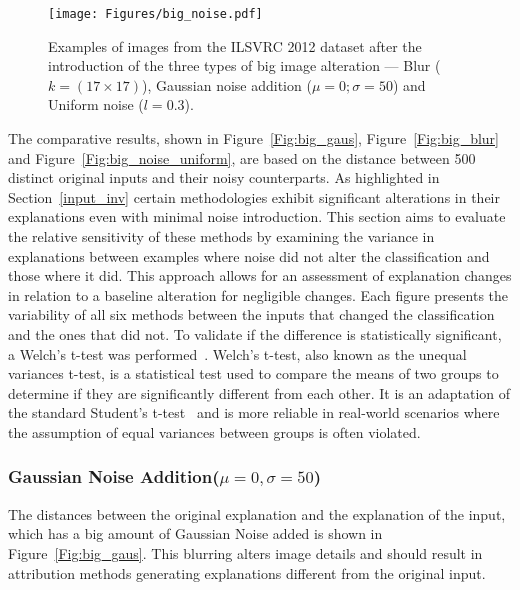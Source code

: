 \begin{figure}[ht!]
	\begin{center}
		\texttt{[image: Figures/big\_noise.pdf]}
	\end{center}
	\caption{Examples of images from the ILSVRC 2012 dataset after the introduction of the three types of big image alteration --- Blur ($k = (17 \times 17)$), Gaussian noise addition ($\mu= 0; \sigma=50$) and Uniform noise ($l = 0.3$).}
	\label{Fig:noisy_images}
\end{figure} 

The comparative results, shown in Figure~\ref{Fig:big_gaus}, Figure~\ref{Fig:big_blur} and Figure~\ref{Fig:big_noise_uniform}, are based on the distance between 500 distinct original inputs and their noisy counterparts. As highlighted in Section~\ref{input_inv} certain methodologies exhibit significant alterations in their explanations even with minimal noise introduction. This section aims to evaluate the relative sensitivity of these methods by examining the variance in explanations between examples where noise did not alter the classification and those where it did. This approach allows for an assessment of explanation changes in relation to a baseline alteration for negligible changes. Each figure presents the variability of all six methods between the inputs that changed the classification and the ones that did not. To validate if the difference is statistically significant, a Welch's t-test was performed~\cite{welch1947generalization}. Welch's t-test, also known as the unequal variances t-test, is a statistical test used to compare the means of two groups to determine if they are significantly different from each other. It is an adaptation of the standard Student's t-test~\cite{student1908probable} and is more reliable in real-world scenarios where the assumption of equal variances between groups is often violated.


\subsubsection{Gaussian Noise Addition($\mu = 0, \sigma = 50$)}
The distances between the original explanation and the explanation of the input, which has a big amount of Gaussian Noise added is shown in Figure~\ref{Fig:big_gaus}. This blurring alters image details and should result in attribution methods generating explanations different from the original input.


